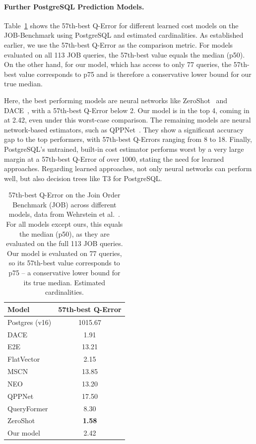 \paragraph{Further PostgreSQL Prediction Models.}

Table~\ref{tab:median_qerror_job} shows the 57th-best Q-Error for different learned cost models on the JOB-Benchmark using PostgreSQL and estimated cardinalities.
As established earlier, we use the 57th-best Q-Error as the comparison metric.
For models evaluated on all 113 JOB queries, the 57th-best value equals the median (p50).
On the other hand, for our model, which has access to only 77 queries, the 57th-best value corresponds to p75 and is therefore a conservative lower bound for our true median.

Here, the best performing models are neural networks like ZeroShot~\parencite{zeroshot} and DACE~\parencite{dace}, with a 57th-best Q-Error below 2.
Our model is in the top 4, coming in at 2.42, even under this worst-case comparison.
The remaining models are neural network-based estimators, such as QPPNet~\parencite{qppnet}.
They show a significant accuracy gap to the top performers, with 57th-best Q-Errors ranging from 8 to 18.
Finally, PostgreSQL's untrained, built-in cost estimator performs worst by a very large margin at a 57th-best Q-Error of over 1000, stating the need for learned approaches.
Regarding learned approaches, not only neural networks can perform well, but also decision trees like T3 for PostgreSQL.


\begin{table}[htpb]
  \centering
  \begin{tabular}{lc}
    \toprule
    \textbf{Model} & \textbf{57th-best Q-Error} \\
    \midrule
    Postgres (v16)  & 1015.67 \\
    DACE            & 1.91    \\
    E2E             & 13.21   \\
    FlatVector      & 2.15    \\
    MSCN            & 13.85   \\
    NEO             & 13.20   \\
    QPPNet          & 17.50   \\
    QueryFormer     & 8.30    \\
    ZeroShot        & \textbf{1.58}    \\
    Our model       & 2.42    \\
    \bottomrule
  \end{tabular}
  \caption[57th-Best Q-Error on JOB across Different Models]{57th-best Q-Error on the Join Order Benchmark (JOB) across different models, data from Wehrstein et al.~\parencite{jobcomplex}. For all models except ours, this equals the median (p50), as they are evaluated on the full 113 JOB queries. Our model is evaluated on 77 queries, so its 57th-best value corresponds to p75 -- a conservative lower bound for its true median. Estimated cardinalities.}\label{tab:median_qerror_job}
\end{table}

